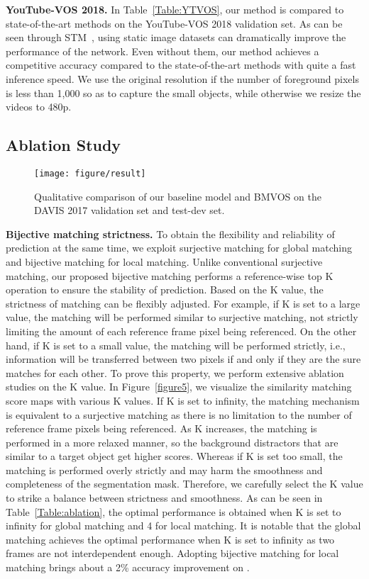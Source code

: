 \documentclass[10pt,twocolumn,letterpaper]{article}
\begin{document}
	
	
	\vspace{1mm} 
	\noindent\textbf{YouTube-VOS 2018.} In Table~\ref{Table:YTVOS}, our method is compared to state-of-the-art methods on the YouTube-VOS 2018 validation set. As can be seen through STM~\cite{STM}, using static image datasets can dramatically improve the performance of the network. Even without them, our method achieves a competitive accuracy compared to the state-of-the-art methods with quite a fast inference speed. We use the original resolution if the number of foreground pixels is less than 1,000 so as to capture the small objects, while otherwise we resize the videos to 480p.
	
	
	\subsection{Ablation Study}
	
	
	\begin{figure*}[t]
		\centering
		\texttt{[image: figure/result]}
		\caption{Qualitative comparison of our baseline model and BMVOS on the DAVIS 2017 validation set and test-dev set.}
		\label{figure6}
	\end{figure*}
	
	
	
	\label{ablation}
	\noindent\textbf{Bijective matching strictness.} To obtain the flexibility and reliability of prediction at the same time, we exploit surjective matching for global matching and bijective matching for local matching. Unlike conventional surjective matching, our proposed bijective matching performs a reference-wise top K operation to ensure the stability of prediction. Based on the K value, the strictness of matching can be flexibly adjusted. For example, if K is set to a large value, the matching will be performed similar to surjective matching, not strictly limiting the amount of each reference frame pixel being referenced. On the other hand, if K is set to a small value, the matching will be performed strictly, i.e., information will be transferred between two pixels if and only if they are the sure matches for each other. To prove this property, we perform extensive ablation studies on the K value. In Figure~\ref{figure5}, we visualize the similarity matching score maps with various K values. If K is set to infinity, the matching mechanism is equivalent to a surjective matching as there is no limitation to the number of reference frame pixels being referenced. As K increases, the matching is performed in a more relaxed manner, so the background distractors that are similar to a target object get higher scores. Whereas if K is set too small, the matching is performed overly strictly and may harm the smoothness and completeness of the segmentation mask. Therefore, we carefully select the K value to strike a balance between strictness and smoothness. As can be seen in Table~\ref{Table:ablation}, the optimal performance is obtained when K is set to infinity for global matching and 4 for local matching. It is notable that the global matching achieves the optimal performance when K is set to infinity as two frames are not interdependent enough. Adopting bijective matching for local matching brings about a 2\% accuracy improvement on .
	
\end{document}

